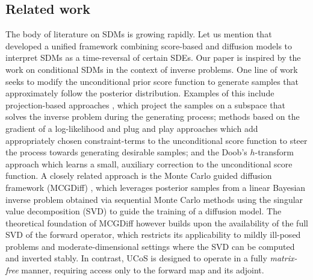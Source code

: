 \documentclass[10pt]{article} %
\theoremstyle{plain}
\theoremstyle{definition}
\theoremstyle{remark}
\newcommand{\duclam}[1]{#1}%
\begin{document}
\subsection{Related work}

The body of literature on SDMs is growing rapidly. Let us mention that \citet{song2021scorebasedDiffusion} developed a unified framework combining score-based \cite{hyvarinen2005estimation, song2019generative} and diffusion \cite{sohl2015deep, ho2020denoising} models to interpret SDMs as a time-reversal of certain SDEs. 
Our paper is inspired by the work on conditional SDMs in the context of inverse problems.
One line of work seeks to modify the unconditional prior score function to generate samples that approximately follow the posterior distribution. Examples of this include projection-based approaches \cite{song2022solving, Dey_2024}, which project the samples on a subspace that solves the inverse problem during the generating process;
methods based on the gradient of a log-likelihood \cite{jalal2021robustannealedlangevian, chung2023diffusion, levac2023mri} and plug and play approaches \cite{graikos2023diffusionplugandplay} which add appropriately chosen constraint-terms to the unconditional score function to steer the process towards generating desirable samples; \duclam{and the Doob’s $h$-transform approach \cite{denker2024deft} which learns a small, auxiliary correction to the unconditional score function.} \duclam{A closely related approach is the Monte Carlo guided diffusion framework (MCGDiff) \cite{cardoso2023monte}, which leverages posterior samples from a linear Bayesian inverse problem obtained via sequential Monte Carlo methods using the singular value decomposition (SVD) to guide the training of a diffusion model. The theoretical foundation of MCGDiff however builds upon the availability of the full SVD of the forward operator, which restricts its applicability to mildly ill-posed problems and moderate-dimensional settings where the SVD can be computed and inverted stably. In contrast, UCoS is designed to operate in a fully \emph{matrix-free} manner, requiring access only to the forward map and its adjoint.}
\end{document}
